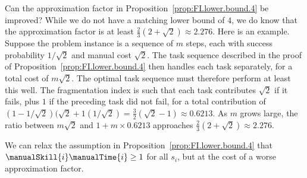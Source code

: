 Can the approximation factor in Proposition~\ref{prop:FI.lower.bound.4} be improved? 
While we do not have a matching lower bound of $4$, we do know that the approximation factor is at least $\tfrac{2}{3}(2+\sqrt{2}) \approx 2.276$.  
Here is an example. 
Suppose the problem instance is a sequence of $m$ steps, each with success probability $1/\sqrt{2}$ and manual cost $\sqrt{2}$.  
The task sequence described in the proof of Proposition~\ref{prop:FI.lower.bound.4} then handles each task separately, for a total cost of $m \sqrt{2}$.  
The optimal task sequence must therefore perform at least this well.  
The fragmentation index is such that each task contributes $\sqrt{2}$ if it fails, plus $1$ if the preceding task did not fail, for a total contribution of $(1-1/\sqrt{2})(\sqrt{2} + 1(1/\sqrt{2}) = \tfrac{3}{2}(\sqrt{2}-1) \approx 0.6213$.  
As $m$ grows large, the ratio between $m\sqrt{2}$ and $1 + m \times 0.6213$ approaches $\tfrac{2}{3}(2+\sqrt{2}) \approx 2.276$.

\bigskip

We can relax the assumption in Proposition~\ref{prop:FI.lower.bound.4} that $\manualSkill{i}\manualTime{i} \geq 1$ for all $s_i$, but at the cost of a worse approximation factor.

